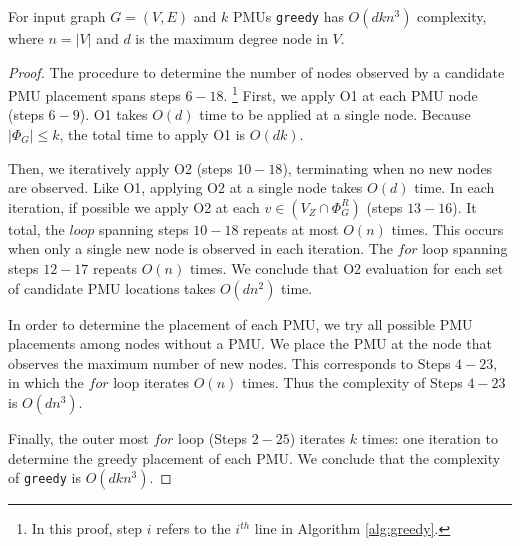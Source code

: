 \begin{theorem}
For input graph $G=(V,E)$ and $k$ PMUs {\tt greedy} has $O(dkn^3)$ complexity, where $n=|V|$ and $d$ is the maximum degree node in $V$.
\label{thm:app-greedy-complex}
\end{theorem}
\begin{proof}
The procedure to determine the number of nodes observed by a candidate PMU placement spans steps $6 - 18$.
{\footnote {\small In this proof, step $i$ refers to the $i^{th}$ line  in Algorithm \ref{alg:greedy}.}}
First, we apply O1 at each PMU node (steps $6 -9$). O1 takes $O(d)$ time 
to be applied at a single node.  Because $|\Phi_G| \leq k$, the total time to apply O1 is $O(dk)$. 

Then, we iteratively apply O2 (steps $10-18$), terminating when no new nodes are observed.  Like O1, applying O2 at a single node takes $O(d)$ time. 
In each iteration, if possible we apply O2 at each $v \in (V_Z \cap \Phi_G^R)$ (steps $13-16$). %
It total, the $loop$ spanning steps $10-18$ repeats at most $O(n)$ times.  This occurs when only a single new node is observed in each iteration.  The $for$ loop spanning steps $12-17$
repeats $O(n)$ times. We conclude that O2 evaluation for each set of candidate PMU locations takes $O(dn^2)$ time.

In order to determine the placement of each PMU, we try all possible PMU placements among nodes without a PMU. We place the PMU at the node that observes the maximum number of new nodes.  This 
corresponds to Steps $4-23$, in which the $for$ loop iterates $O(n)$ times. 
Thus the complexity of Steps $4-23$ is $O(dn^3)$. 

Finally, the outer most $for$ loop (Steps $2-25$) iterates $k$ times: one iteration
to determine the greedy placement of each PMU.  We conclude that the complexity of {\tt greedy} is $O(dkn^3)$. 
\end{proof}


